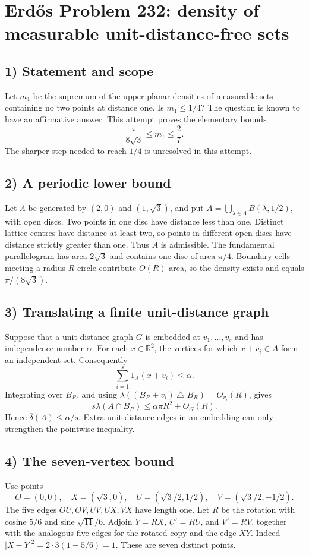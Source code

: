 \section{Erd\H{o}s Problem 232: density of measurable unit-distance-free sets}

\subsection{1) Statement and scope}
Let $m_1$ be the supremum of the upper planar densities of measurable
sets containing no two points at distance one. Is $m_1\leq1/4$?
The question is known to have an affirmative answer. This attempt
proves the elementary bounds
\[
 \frac{\pi}{8\sqrt3}\leq m_1\leq\frac27.
\]
The sharper step needed to reach $1/4$ is unresolved in this attempt.

\subsection{2) A periodic lower bound}
Let $\Lambda$ be generated by $(2,0)$ and $(1,\sqrt3)$, and put
$A=\bigcup_{\lambda\in\Lambda}B(\lambda,1/2)$, with open discs.
Two points in one disc have distance less than one. Distinct lattice
centres have distance at least two, so points in different open discs
have distance strictly greater than one. Thus $A$ is admissible.
The fundamental parallelogram has area $2\sqrt3$ and contains one
disc of area $\pi/4$. Boundary cells meeting a radius-$R$ circle
contribute $O(R)$ area, so the density exists and equals
$\pi/(8\sqrt3)$.

\subsection{3) Translating a finite unit-distance graph}
Suppose that a unit-distance graph $G$ is embedded at
$v_1,\ldots,v_s$ and has independence number $\alpha$.
For each $x\in\mathbb R^2$, the vertices for which $x+v_i\in A$
form an independent set. Consequently
\[
 \sum_{i=1}^s1_A(x+v_i)\leq\alpha.
\]
Integrating over $B_R$, and using
$\lambda((B_R+v_i)\mathbin{\triangle}B_R)=O_{v_i}(R)$, gives
\[
 s\lambda(A\cap B_R)\leq\alpha\pi R^2+O_G(R).
\]
Hence $\overline\delta(A)\leq\alpha/s$. Extra unit-distance edges
in an embedding can only strengthen the pointwise inequality.

\subsection{4) The seven-vertex bound}
Use points
\[
 O=(0,0),\quad X=(\sqrt3,0),\quad
 U=(\sqrt3/2,1/2),\quad V=(\sqrt3/2,-1/2).
\]
The five edges $OU,OV,UV,UX,VX$ have length one.
Let $R$ be the rotation with cosine $5/6$ and sine $\sqrt{11}/6$.
Adjoin $Y=RX$, $U'=RU$, and $V'=RV$, together with the analogous
five edges for the rotated copy and the edge $XY$.
Indeed $|X-Y|^2=2\cdot3(1-5/6)=1$.
These are seven distinct points.

